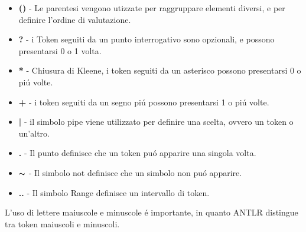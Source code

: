 \documentclass[../../main.tex]{subfiles}
\begin{document}
\begin{itemize}
    \item \textbf{()} - Le parentesi vengono utizzate per raggruppare elementi diversi, e per definire l'ordine di valutazione.
    \item \textbf{?} - i Token seguiti da un punto interrogativo sono opzionali, e possono presentarsi 0 o 1 volta.
    \item \textbf{*} - Chiusura di Kleene, i token seguiti da un asterisco possono presentarsi 0 o piú volte.
    \item \textbf{+} - i token seguiti da un segno piú possono presentarsi 1 o piú volte.
    \item \textbf{|} - il simbolo pipe viene utilizzato per definire una scelta, ovvero un token o un'altro.
    \item \textbf{.} - Il punto definisce che un token puó apparire una singola volta.
    \item \textbf{$\thicksim$ } - Il simbolo not definisce che un simbolo non puó apparire.
    \item \textbf{..} - Il simbolo Range definisce un intervallo di token.
\end{itemize}
L'uso di lettere maiuscole e minuscole é importante, in quanto ANTLR distingue tra token maiuscoli e minuscoli.\\
\autocite{amslaurea2372}
\end{document}
